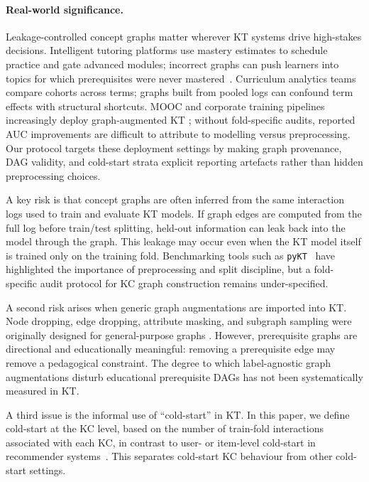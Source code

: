 \documentclass[pdflatex,sn-basic]{sn-jnl}
\begin{document}
\paragraph{Real-world significance.}
Leakage-controlled concept graphs matter wherever KT systems drive
high-stakes decisions. Intelligent tutoring platforms use mastery
estimates to schedule practice and gate advanced modules; incorrect
graphs can push learners into topics for which prerequisites were never
mastered~\cite{heffernan2006assist,junyi_dataset}. Curriculum analytics
teams compare cohorts across terms; graphs built from pooled logs can
confound term effects with structural shortcuts. MOOC and corporate
training pipelines increasingly deploy graph-augmented KT
\cite{choi2020ednet,xes3g5m2023}; without fold-specific audits,
reported AUC improvements are difficult to attribute to modelling
versus preprocessing. Our protocol targets these deployment settings by
making graph provenance, DAG validity, and cold-start strata explicit
reporting artefacts rather than hidden preprocessing choices.

A key risk is that concept graphs are often inferred from the same
interaction logs used to train and evaluate KT models. If graph edges
are computed from the full log before train/test splitting, held-out
information can leak back into the model through the graph. This leakage
may occur even when the KT model itself is trained only on the training
fold. Benchmarking tools such as \texttt{pyKT}~\cite{liu2022pykt} have
highlighted the importance of preprocessing and split discipline, but a
fold-specific audit protocol for KC graph construction remains
under-specified.

A second risk arises when generic graph augmentations are imported into
KT. Node dropping, edge dropping, attribute masking, and subgraph
sampling were originally designed for general-purpose graphs
\cite{you2020graphcl,zhu2021gca,xia2022simgrace,thakoor2021bgrl,velickovic2018dgi,hassani2020mvgrl}. However, prerequisite graphs are
directional and educationally meaningful: removing a prerequisite edge
may remove a pedagogical constraint. The degree to which label-agnostic
graph augmentations disturb educational prerequisite DAGs has not been
systematically measured in KT.

A third issue is the informal use of ``cold-start'' in KT. In this
paper, we define cold-start at the KC level, based on the number of
train-fold interactions associated with each KC, in contrast to user- or
item-level cold-start in recommender systems~\cite{schein2002coldstart}.
This separates cold-start KC behaviour from other cold-start settings.
\end{document}
